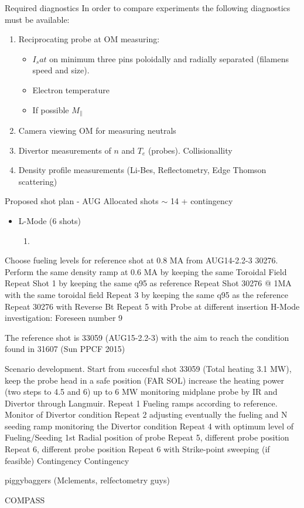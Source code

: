 \documentclass[10pt, compress]{beamer}
\begin{document}
\begin{frame}{Required diagnostics}
In order to compare experiments the following diagnostics must be available: 
\begin{enumerate}
	\item Reciprocating probe at OM measuring: 
	\begin{itemize} 
		\item $I_sat$ on minimum three pins poloidally and radially separated
		 (filamens speed and size). 
		\item Electron temperature
		\item If possible $M_{\|}$
	 \end{itemize}
	 \item Camera viewing OM for measuring neutrals 
	 \item Divertor measurements of $n$ and $T_e$ (probes). Collisionallity
	 \item Density profile measurements (Li-Bes, Reflectometry, Edge Thomson scattering) 
\end{enumerate}
\end{frame}

\begin{frame}{Proposed shot plan - AUG}
Allocated shots $\sim$ 14 + contingency 
\begin{itemize}
	\item L-Mode (6 shots)
	\begin{enumerate}
		\item 
	\end{enumerate}
\end{itemize}

Choose fueling levels for reference shot at 0.8 MA from AUG14-2.2-3 30276. Perform the same density ramp at 0.6 MA by keeping the same Toroidal Field
Repeat Shot  1 by keeping the same q95 as reference
Repeat Shot  30276 @ 1MA with the same toroidal field
Repeat  3 by keeping the same q95 as the reference
Repeat  30276 with Reverse Bt
Repeat  5 with Probe at different insertion
H-Mode investigation: Foreseen number 9

The reference shot is 33059 (AUG15-2.2-3) with the aim to reach the condition found in 31607 (Sun PPCF 2015)

Scenario development. Start from succesful shot 33059 (Total heating 3.1 MW), keep the probe head in a safe position (FAR SOL) increase the heating power (two steps to 4.5 and 6) up to 6 MW monitoring midplane probe by IR and Divertor through Langmuir.
Repeat  1 Fueling ramps according to reference. Monitor of Divertor condition
Repeat  2 adjusting eventually the fueling and N seeding ramp monitoring the Divertor condition
Repeat  4 with optimum level of Fueling/Seeding 1st Radial position of probe
Repeat  5, different probe position
Repeat  6, different probe position
Repeat  6 with Strike-point sweeping (if feasible)
Contingency
Contingency

	

	piggybaggers (Mclements, relfectometry guys)
	
	COMPASS
\end{frame}
\end{document}
